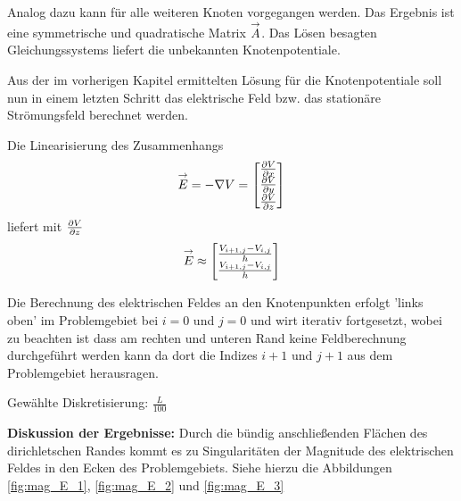 Analog dazu kann für alle weiteren Knoten vorgegangen werden. Das Ergebnis ist eine symmetrische und quadratische Matrix $\overset{\rightarrow}{A}$. Das Lösen besagten Gleichungssystems liefert die unbekannten Knotenpotentiale.

 Aus der im vorherigen Kapitel ermittelten Lösung für die Knotenpotentiale soll nun in einem letzten Schritt das elektrische Feld bzw. das stationäre Strömungsfeld berechnet werden.\newline
 
 Die Linearisierung des Zusammenhangs
 \begin{align*}
 	\overset{\rightarrow}{E} = -\nabla V = 	
 	\begin{bmatrix}
 		\frac{\partial V}{\partial x}\\
 		\frac{\partial V}{\partial y}\\
 		\frac{\partial V}{\partial z}
 	\end{bmatrix} 
 \end{align*}
liefert mit $\frac{\partial V}{\partial z}$
\begin{align}
	\overset{\rightarrow}{E}\approx \begin{bmatrix}
	\frac{V_{i+1,j} - V_{i,j}}{h}\\
	\frac{V_{i+1,j} - V_{i,j}}{h}
	\end{bmatrix} 
\end{align}

Die Berechnung des elektrischen Feldes an den Knotenpunkten erfolgt 'links oben' im Problemgebiet bei $i = 0$ und $j = 0$ und wirt iterativ fortgesetzt, wobei zu beachten ist dass am rechten und unteren Rand keine Feldberechnung durchgeführt werden kann da dort die Indizes $i+1$ und $j+1$ aus dem Problemgebiet herausragen.\newline


Gewählte Diskretisierung: $\frac{L}{100}$\newline

\textbf{Diskussion der Ergebnisse:}
Durch die bündig anschließenden Flächen des dirichletschen Randes kommt es zu Singularitäten der Magnitude des elektrischen Feldes in den Ecken des Problemgebiets. Siehe hierzu die Abbildungen \ref{fig:mag_E_1}, \ref{fig:mag_E_2} und \ref{fig:mag_E_3}

